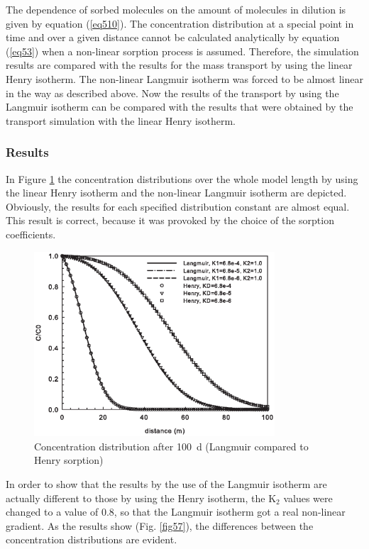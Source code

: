 The dependence of sorbed molecules on the amount of molecules in dilution is given by equation (\ref{eq510}). The concentration distribution at a special point in time and over a given distance cannot be calculated analytically by equation (\ref{eq53}) when a non-linear sorption process is assumed. Therefore, the simulation results are compared with the results for the mass transport by using the linear Henry isotherm. The non-linear Langmuir isotherm was forced to be almost linear in the way as described above. Now the results of the transport by using the Langmuir isotherm can be compared with the results that were obtained by the transport simulation with the linear Henry isotherm.

\subsubsection{Results}

In Figure \ref{fig56} the concentration distributions over the whole model length by using the linear Henry isotherm and the non-linear Langmuir isotherm are depicted. Obviously, the results for each specified distribution constant are almost equal. This result is correct, because it was provoked by the choice of the sorption coefficients.

\begin{figure}[htbp]
\centering
\includegraphics[width=0.8\textwidth]{PART_II/C/fig56.EPS}
\caption{Concentration distribution after 100~d (Langmuir compared to Henry sorption)}
\label{fig56}
\end{figure}

In order to show that the results by the use of the Langmuir isotherm are actually different to those by using the Henry isotherm, the K$_2$ values were changed to a value of 0.8, so that the Langmuir isotherm got a real non-linear gradient. As the results show (Fig. \ref{fig57}), the differences between the concentration distributions are evident.

